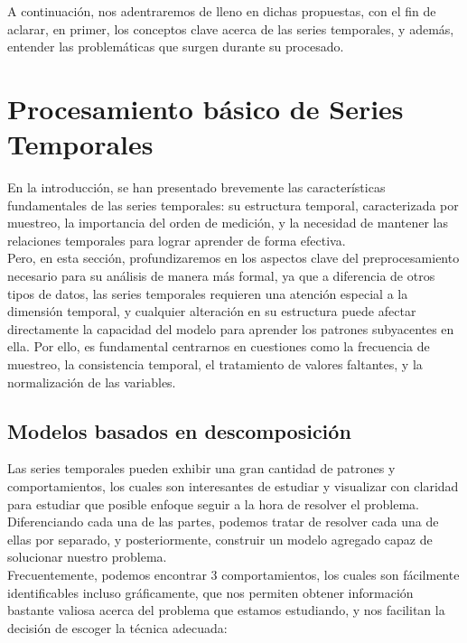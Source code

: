 A continuación, nos adentraremos de lleno en dichas propuestas, con el fin de aclarar, en primer, los conceptos clave acerca de las series temporales, y además, entender las problemáticas que surgen durante su procesado.

\section{Procesamiento básico de Series Temporales}

En la introducción, se han presentado brevemente las características fundamentales de las series temporales: su estructura temporal, caracterizada por muestreo, la importancia del orden de medición, y la necesidad de mantener las relaciones temporales para lograr aprender de forma efectiva.\\

Pero, en esta sección, profundizaremos en los aspectos clave del preprocesamiento necesario para su análisis de manera más formal, ya que a diferencia de otros tipos de datos, las series temporales requieren una atención especial a la dimensión temporal, y cualquier alteración en su estructura puede afectar directamente la capacidad del modelo para aprender los patrones subyacentes en ella. Por ello, es fundamental centrarnos en cuestiones como la frecuencia de muestreo, la consistencia temporal, el tratamiento de valores faltantes, y la normalización de las variables.

\subsection{Modelos basados en descomposición}

Las series temporales pueden exhibir una gran cantidad de patrones y comportamientos, los cuales son interesantes de estudiar y visualizar con claridad para estudiar que posible enfoque seguir a la hora de resolver el problema. Diferenciando cada una de las partes, podemos tratar de resolver cada una de ellas por separado, y posteriormente, construir un modelo agregado capaz de solucionar nuestro problema.\\

Frecuentemente, podemos encontrar 3 comportamientos, los cuales son fácilmente identificables incluso gráficamente, que nos permiten obtener información bastante valiosa acerca del problema que estamos estudiando, y nos facilitan la decisión de escoger la técnica adecuada:

